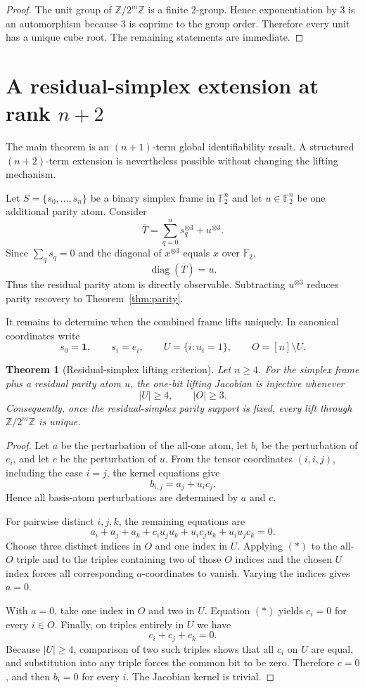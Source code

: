 \documentclass[11pt]{article}
\newtheorem{theorem}{Theorem}
\theoremstyle{definition}
\newcommand{\F}{\mathbb{F}}
\newcommand{\Z}{\mathbb{Z}}
\newcommand{\one}{\mathbf{1}}
\begin{document}
\begin{proof}
The unit group of $\Z/2^m\Z$ is a finite $2$-group. Hence exponentiation by $3$ is an automorphism because $3$ is coprime to the group order. Therefore every unit has a unique cube root. The remaining statements are immediate.
\end{proof}


\section{A residual-simplex extension at rank $n+2$}
The main theorem is an $(n+1)$-term global identifiability result. A structured $(n+2)$-term extension is nevertheless possible without changing the lifting mechanism.

Let $S=\{s_0,\ldots,s_n\}$ be a binary simplex frame in $\F_2^n$ and let $u\in\F_2^n$ be one additional parity atom. Consider
\[
\overline T=\sum_{q=0}^{n}s_q^{\otimes3}+u^{\otimes3}.
\]
Since $\sum_q s_q=0$ and the diagonal of $x^{\otimes3}$ equals $x$ over $\F_2$,
\[
\operatorname{diag}(\overline T)=u.
\]
Thus the residual parity atom is directly observable. Subtracting $u^{\otimes3}$ reduces parity recovery to Theorem~\ref{thm:parity}.

It remains to determine when the combined frame lifts uniquely. In canonical coordinates write
\[
s_0=\one,\qquad s_i=e_i,\qquad U=\{i:u_i=1\},\qquad O=[n]\setminus U.
\]

\begin{theorem}[Residual-simplex lifting criterion]\label{thm:residual}
Let $n\ge 4$. For the simplex frame plus a residual parity atom $u$, the one-bit lifting Jacobian is injective whenever
\[
|U|\ge 4,\qquad |O|\ge 3.
\]
Consequently, once the residual-simplex parity support is fixed, every lift through $\Z/2^m\Z$ is unique.
\end{theorem}

\begin{proof}
Let $a$ be the perturbation of the all-one atom, let $b_i$ be the perturbation of $e_i$, and let $c$ be the perturbation of $u$. From the tensor coordinates $(i,i,j)$, including the case $i=j$, the kernel equations give
\[
b_{i,j}=a_j+u_i c_j.
\]
Hence all basis-atom perturbations are determined by $a$ and $c$.

For pairwise distinct $i,j,k$, the remaining equations are
\[
a_i+a_j+a_k+
c_i u_j u_k+
u_i c_j u_k+
u_i u_j c_k=0. \tag{*}
\]
Choose three distinct indices in $O$ and one index in $U$. Applying $(*)$ to the all-$O$ triple and to the triples containing two of those $O$ indices and the chosen $U$ index forces all corresponding $a$-coordinates to vanish. Varying the indices gives $a=0$.

With $a=0$, take one index in $O$ and two in $U$. Equation $(*)$ yields $c_i=0$ for every $i\in O$. Finally, on triples entirely in $U$ we have
\[
c_i+c_j+c_k=0.
\]
Because $|U|\ge4$, comparison of two such triples shows that all $c_i$ on $U$ are equal, and substitution into any triple forces the common bit to be zero. Therefore $c=0$, and then $b_i=0$ for every $i$. The Jacobian kernel is trivial.
\end{proof}
\end{document}
